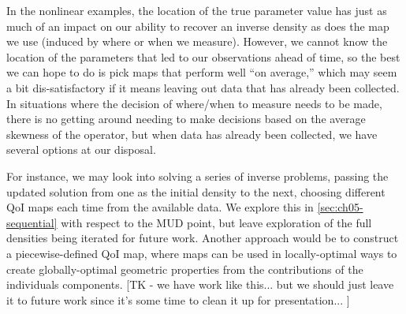 In the nonlinear examples, the location of the true parameter value has just as much of an impact on our ability to recover an inverse density as does the map we use (induced by where or when we measure).
However, we cannot know the location of the parameters that led to our observations ahead of time, so the best we can hope to do is pick maps that perform well ``on average,'' which may seem a bit dis-satisfactory if it means leaving out data that has already been collected.
In situations where the decision of where/when to measure needs to be made, there is no getting around needing to make decisions based on the average skewness of the operator, but when data has already been collected, we have several options at our disposal.

For instance, we may look into solving a series of inverse problems, passing the updated solution from one as the initial density to the next, choosing different QoI maps each time from the available data.
We explore this in \ref{sec:ch05-sequential} with respect to the MUD point, but leave exploration of the full densities being iterated for future work.
Another approach would be to construct a piecewise-defined QoI map, where maps can be used in locally-optimal ways to create globally-optimal geometric properties from the contributions of the individuals components.
[TK - we have work like this... but we should just leave it to future work since it's some time to clean it up for presentation... ]
